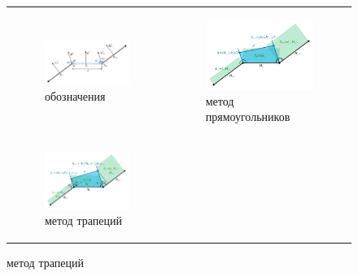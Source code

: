 \documentclass[a4paper,14pt]{extarticle}                     %
\theoremstyle{plain}                                         %
\begin{document}
\begin{figure}[ht]
\centering
\begin{tabular}{ll}
\begin{subfigure}{0.45\textwidth}\centering\includegraphics[width=0.75\columnwidth]{fig/2dr_grid_normals.pdf}\caption{обозначения}\end{subfigure} &
\begin{subfigure}{0.45\textwidth}\centering\includegraphics[width=0.75\columnwidth]{fig/2dr_remesh_rectangles.pdf}\caption{метод прямоугольников}\end{subfigure} \\
\begin{subfigure}{0.45\textwidth}\centering\includegraphics[width=0.75\columnwidth]{fig/2dr_remesh_trapeziums.pdf}\caption{метод трапеций}\end{subfigure} &

\end{tabular}
\end{figure}
\end{document}
